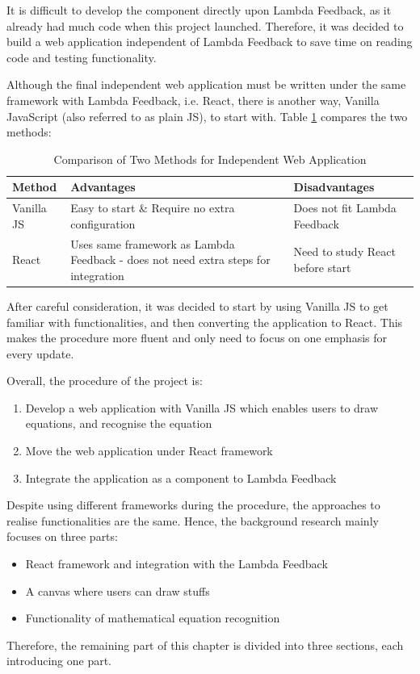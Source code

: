 \documentclass[12pt,twoside]{report}
\begin{document}
It is difficult to develop the component directly upon Lambda Feedback, as it
already had much code when this project launched. Therefore, it was decided to
build a web application independent of Lambda Feedback to save time on reading
code and testing functionality.

Although the final independent web application must be written under the same
framework with Lambda Feedback, i.e. React, there is another way,
Vanilla JavaScript (also referred to as plain JS), to start with. Table \ref{MethodComparison} compares the two methods:
\begin{table}[H]
    \centering
    \caption{Comparison of Two Methods for Independent Web Application}
    \label{MethodComparison}
    \begin{tabular}{|m{}|m{}|m{}|}
        \hline
        \textbf{Method} & \textbf{Advantages} & \textbf{Disadvantages}\\
        \hline
        Vanilla JS & Easy to start \& Require no extra configuration&
        Does not fit Lambda Feedback\\
        \hline
        React & Uses same framework as Lambda Feedback - does not need extra steps for integration & Need to study React before start\\
        \hline
    \end{tabular}
\end{table}
After careful consideration, it was decided to start by using Vanilla JS to get familiar with functionalities, and then converting the application to React. This makes the procedure more fluent and only need to focus on one emphasis for every update.

Overall, the procedure of the project is:
\begin{enumerate}
    \item Develop a web application with Vanilla JS which enables users to draw equations, and recognise the equation
    \item Move the web application under React framework
    \item Integrate the application as a component to Lambda Feedback
\end{enumerate}


Despite using different frameworks during the procedure, the approaches to realise functionalities are the same. Hence, the background research mainly focuses on three parts:
\begin{itemize}
    \item React framework and integration with the Lambda Feedback
    \item A canvas where users can draw stuffs
    \item Functionality of mathematical equation recognition
\end{itemize}
Therefore, the remaining part of this chapter is divided into three sections, each introducing one part. 
\end{document}
